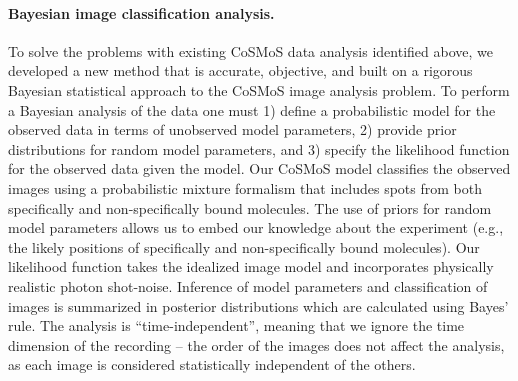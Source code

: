 \paragraph{Bayesian image classification analysis.}
To solve the problems with existing CoSMoS data analysis identified above, we developed a new method that is accurate, objective, and built on a rigorous Bayesian statistical approach to the CoSMoS image analysis problem. To perform a Bayesian analysis of the data one must 1) define a probabilistic model for the observed data in terms of unobserved model parameters, 2) provide prior distributions for random model parameters, and 3) specify the likelihood function for the observed data given the model. Our CoSMoS model classifies the observed images using a probabilistic mixture formalism that includes spots from both specifically and non-specifically bound molecules. The use of priors for random model parameters allows us to embed our knowledge about the experiment (e.g., the likely positions of specifically and non-specifically bound molecules). Our likelihood function takes the idealized image model and incorporates physically realistic photon shot-noise. Inference of model parameters and classification of images is summarized in posterior distributions which are calculated using Bayes' rule. The analysis is “time-independent”, meaning that we ignore the time dimension of the recording -- the order of the images does not affect the analysis, as each image is considered statistically independent of the others. 

